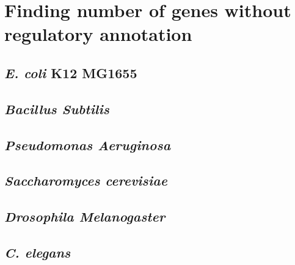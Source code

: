 \section{Finding number of genes without regulatory annotation} \label{sec:reg_ignorance}
\subsection{\textit{E. coli} K12 MG1655}
\subsection{\textit{Bacillus Subtilis}}
\subsection{\textit{Pseudomonas Aeruginosa}}
\subsection{\textit{Saccharomyces cerevisiae}}
\subsection{\textit{Drosophila Melanogaster}}
\subsection{\textit{C. elegans}}
